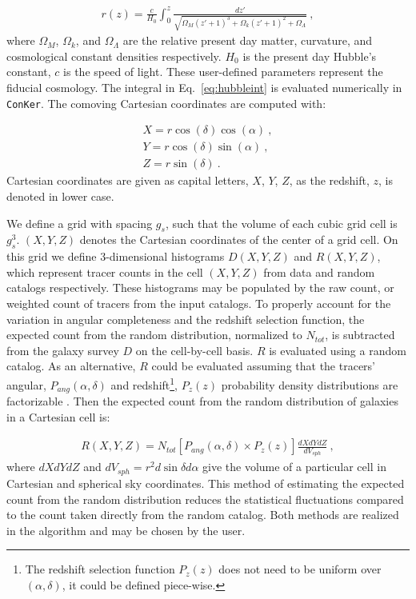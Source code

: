 \documentclass{aa}
\begin{document}
\begin{align}
r(z) = \frac{c}{H_0} { \displaystyle\int_{0}^{z} } \frac{dz'}{ \sqrt{\Omega_M(z'+1)^3+\Omega_k(z'+1)^2+\Omega_\Lambda} }\ , 
\label{eq:hubbleint}
\end{align} 
%
where $\Omega_M$, $\Omega_k$, and $\Omega_\Lambda$ are the relative present day matter, curvature, and cosmological constant densities respectively. $H_0$ is the present day Hubble's constant, $c$ is the speed of light. These user-defined parameters represent the fiducial cosmology. The integral in Eq.~\ref{eq:hubbleint} is evaluated numerically in {\tt ConKer}.
The comoving Cartesian coordinates are computed with:

\begin{align}
X=r \cos(\delta)\cos(\alpha)\ , 
\label{eq:cartesianx} \\
Y=r \cos(\delta)\sin(\alpha)\ ,
\label{eq:cartesiany} \\
Z=r \sin(\delta)\ .
\label{eq:cartesianz}
\end{align}
%
Cartesian coordinates are given as capital letters, $X$, $Y$, $Z$, as the redshift, $z$, is denoted in lower case.

We define a grid with spacing $g_s$, such that the volume of each cubic grid cell is $g_s^3$. $(X,Y,Z)$ denotes the Cartesian coordinates of the center of a grid cell. On this grid we define 3-dimensional histograms $D(X,Y,Z)$ and $R(X,Y,Z)$, which represent tracer counts in the cell $(X,Y,Z)$ from data and random catalogs respectively. These histograms may be populated by the raw count, or weighted count of tracers from the input catalogs. To properly account for the variation in angular completeness and the redshift selection function, the expected count from the random distribution, normalized to $N_{tot}$, is subtracted from the galaxy survey $D$ on the cell-by-cell basis. $R$ is evaluated using a random catalog. As an alternative, $R$ could be evaluated assuming that the tracers' angular, $P_{ang}(\alpha,\delta)$ and redshift\footnote{The redshift selection function $P_z(z)$ does not need to be uniform over $(\alpha,\delta)$, it could be defined piece-wise.}, $P_z(z)$ probability density distributions are factorizable \citep{demina2018computationally}. Then the expected count from the random distribution of galaxies in a Cartesian cell is:

\begin{align}
R(X,Y,Z) = N_{tot} [ P_{ang}(\alpha,\delta) \times P_z(z) ] \frac{dXdYdZ}{dV_{sph}} \ , 
\label{eq:factorizablility}
\end{align} 
%
where $dXdYdZ$ and $dV_{sph}=r^2d \sin \delta d \alpha$ give the volume of a particular cell in Cartesian and spherical sky coordinates.
This method of estimating the expected count from the random distribution reduces the statistical fluctuations compared to the count taken directly from the random catalog. Both methods are realized in the algorithm and may be chosen by the user. 
 
\end{document}
